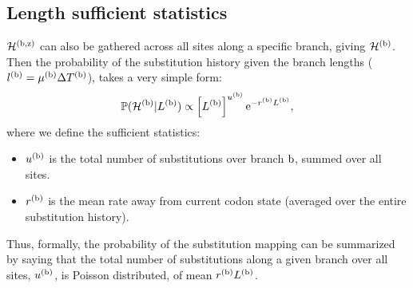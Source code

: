 \subsection{Length sufficient statistics}
$\mathcal{H}^{(\text{b}, \text{z})}$ can also be gathered across all sites along a specific branch, giving $\mathcal{H}^{(\text{b})}$.
Then the probability of the {substitution} history given the branch lengths ($l^{(\text{b})} = \mu^{(\text{b})} \Delta T^{(\text{b})}$), takes a very simple form:
\begin{equation}
    \label{eq:LengthSuffStat}
    \mathbb{P} (\mathcal{H}^{(\text{b})} | L^{(\text{b})}) \propto \left[ L^{(\text{b})}\right]^{u^{(\text{b})}} \text{e}^{- r^{(\text{b})} L^{(\text{b})}},
\end{equation}
where we define the sufficient statistics:
\begin{itemize}
    \setlength\itemsep{-0.25em}
    \item $u^{(\text{b})}$ is the total number of substitutions over branch $\text{b}$, summed over all sites.
    \item $r^{(\text{b})}$ is the mean rate away from current {codon} state (averaged over the entire {substitution} history).
\end{itemize}
Thus, formally, the probability of the {substitution} mapping can be summarized by saying that the total number of substitutions along a given branch over all sites, $u^{(\text{b})}$, is Poisson distributed, of mean $r^{(\text{b})} L^{(\text{b})}$.

